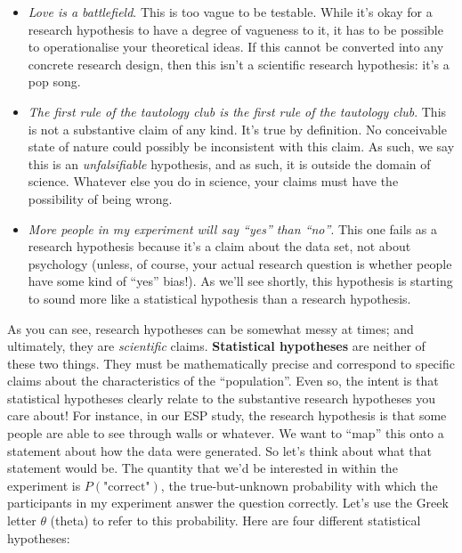 \documentclass[
  11pt,
  a4paper,
  twoside,symmetric,openright]{book}
\providecommand{\tightlist}{%
  \setlength{\itemsep}{0pt}\setlength{\parskip}{0pt}}
\theoremstyle{break}
\theoremstyle{break}
\begin{document}
\begin{itemize}
\tightlist
\item
  \emph{Love is a battlefield}. This is too vague to be testable. While it's okay for a research hypothesis to have a degree of vagueness to it, it has to be possible to operationalise your theoretical ideas. If this cannot be converted into any concrete research design, then this isn't a scientific research hypothesis: it's a pop song.
\item
  \emph{The first rule of the tautology club is the first rule of the tautology club}. This is not a substantive claim of any kind. It's true by definition. No conceivable state of nature could possibly be inconsistent with this claim. As such, we say this is an \emph{unfalsifiable} hypothesis, and as such, it is outside the domain of science. Whatever else you do in science, your claims must have the possibility of being wrong.
\item
  \emph{More people in my experiment will say ``yes'' than ``no''}. This one fails as a research hypothesis because it's a claim about the data set, not about psychology (unless, of course, your actual research question is whether people have some kind of ``yes'' bias!). As we'll see shortly, this hypothesis is starting to sound more like a statistical hypothesis than a research hypothesis.
\end{itemize}

As you can see, research hypotheses can be somewhat messy at times; and ultimately, they are \emph{scientific} claims. \textbf{Statistical hypotheses} are neither of these two things. They must be mathematically precise and correspond to specific claims about the characteristics of the ``population''. Even so, the intent is that statistical hypotheses clearly relate to the substantive research hypotheses you care about! For instance, in our ESP study, the research hypothesis is that some people are able to see through walls or whatever. We want to ``map'' this onto a statement about how the data were generated. So let's think about what that statement would be. The quantity that we'd be interested in within the experiment is \(P(\mbox{"correct"})\), the true-but-unknown probability with which the participants in my experiment answer the question correctly. Let's use the Greek letter \(\theta\) (theta) to refer to this probability. Here are four different statistical hypotheses:
\end{document}
